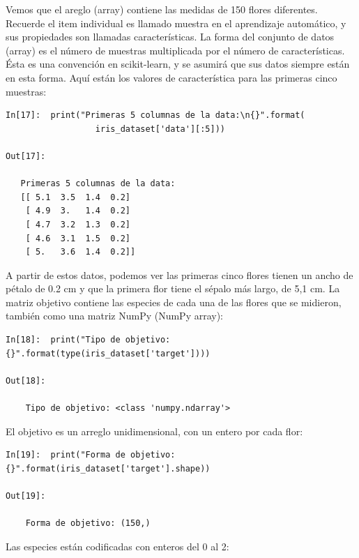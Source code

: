 Vemos que el areglo (array) contiene las medidas de 150 flores diferentes. Recuerde
el item individual es llamado muestra en el aprendizaje automático, y sus propiedades son llamadas características. La forma del conjunto  de datos (array) es el número de muestras multiplicada por el número de características. Ésta es una convención en scikit-learn, y se asumirá que sus datos siempre están en esta forma. Aquí están los valores de característica para las primeras cinco muestras:\\

\begin{lstlisting}
In[17]:  print("Primeras 5 columnas de la data:\n{}".format(
                  iris_dataset['data'][:5]))

Out[17]:

   Primeras 5 columnas de la data:
   [[ 5.1  3.5  1.4  0.2]
    [ 4.9  3.   1.4  0.2]
    [ 4.7  3.2  1.3  0.2]
    [ 4.6  3.1  1.5  0.2]
    [ 5.   3.6  1.4  0.2]]
\end{lstlisting}



A partir de estos datos, podemos ver las primeras cinco flores tienen un ancho de pétalo de 0.2 cm
y que la primera flor tiene el sépalo más largo, de 5,1 cm. La matriz objetivo contiene las especies de cada una de las flores que se midieron, también como una matriz NumPy (NumPy array): \\

\begin{lstlisting}
In[18]:  print("Tipo de objetivo: {}".format(type(iris_dataset['target'])))

Out[18]:

    Tipo de objetivo: <class 'numpy.ndarray'>
\end{lstlisting}

  El objetivo es un arreglo unidimensional, con un entero por cada flor:\\ 

\begin{lstlisting}
In[19]:  print("Forma de objetivo: {}".format(iris_dataset['target'].shape))

Out[19]:

    Forma de objetivo: (150,)
\end{lstlisting}

  Las especies están codificadas con enteros del 0 al 2:\\

